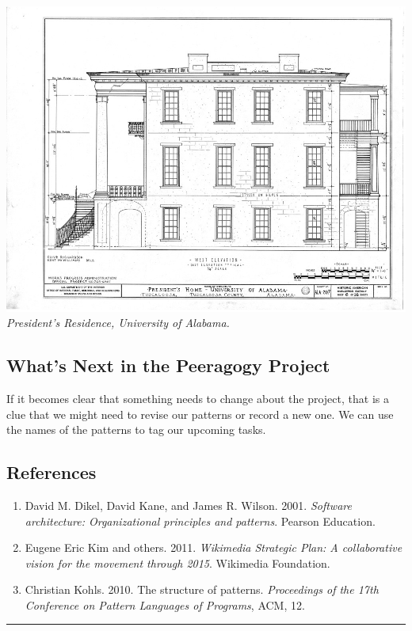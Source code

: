 \includegraphics{images/alabama-small.jpg}\\
\emph{President's Residence, University of Alabama.}

\hypertarget{whats-next-in-the-peeragogy-project}{%
\subsection{What's Next in the Peeragogy
Project}\label{whats-next-in-the-peeragogy-project}}

If it becomes clear that something needs to change about the project,
that is a clue that we might need to revise our patterns or record a new
one. We can use the names of the patterns to tag our upcoming tasks.

\hypertarget{references}{%
\subsection{References}\label{references}}

\begin{enumerate}
\def\labelenumi{\arabic{enumi}.}
\item
  David M. Dikel, David Kane, and James R. Wilson. 2001. \emph{Software
  architecture: Organizational principles and patterns}. Pearson
  Education.
\item
  Eugene Eric Kim and others. 2011. \emph{Wikimedia Strategic Plan: A
  collaborative vision for the movement through 2015}. Wikimedia
  Foundation.
\item
  Christian Kohls. 2010. The structure of patterns. \emph{Proceedings of
  the 17th Conference on Pattern Languages of Programs}, ACM, 12.
\end{enumerate}

\begin{center}\rule{0.5\linewidth}{0.5pt}\end{center}
